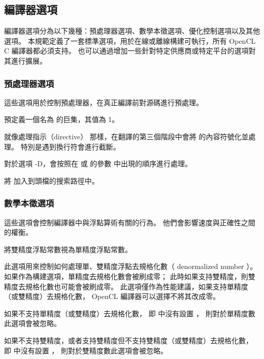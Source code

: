 \subsection{編譯器選項}

編譯器選項分為以下幾種：預處理器選項、數學本徵選項、優化控制選項以及其他選項。
本規範定義了一套標準選項，用於在線或離線構建可執行，所有 OpenCL C 編譯器都必須支持。
也可以通過增加一些針對特定供應商或特定平台的選項對其進行擴展。

\subsubsection{預處理器選項}
這些選項用於控制預處理器，在真正編譯前對源碼進行預處理。

預定義一個名為  的巨集，其值為 1。
\stopclOption

就像處理指示（directive）  那樣，在翻譯的第三個階段中會將  的內容符號化並處理。
特別是遇到換行符會進行截斷。
\stopclOption

對於選項 -D，會按照在  或  的參數  中出現的順序進行處理。

將  加入到頭檔的搜索路徑中。
\stopclOption

\subsubsection[sec:MathIntrinsicsOption]{數學本徵選項}
這些選項會控制編譯器中與浮點算術有關的行為。
他們會影響速度與正確性之間的權衡。

將雙精度浮點常數視為單精度浮點常數。
\stopclOption

此選項用來控制如何處理單、雙精度浮點去規格化數（ denormalized number ）。
如果作為構建選項，單精度去規格化數會被刷成零；
此時如果支持雙精度，則雙精度去規格化數也可能會被刷成零。
此選項僅作為性能建議，如果支持單精度（或雙精度）去規格化數，
 OpenCL 編譯器可以選擇不將其改成零。

如果不支持單精度（或雙精度）去規格化數，
即  中沒有設置 ，
則對於單精度數此選項會被忽略。

如果不支持雙精度，或者支持雙精度但不支持雙精度（或雙精度）去規格化數，
即  中沒有設置 ，
則對於雙精度數此選項會被忽略。

